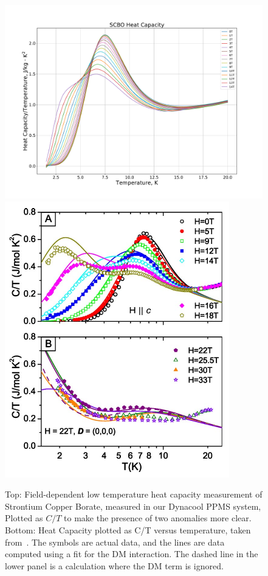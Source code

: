 \documentclass{thesis-umich}
\begin{document}
\begin{figure}
	\centering
	\caption[Low Temperature Heat Capacity of SCBO]{Top: Field-dependent low temperature heat capacity measurement of Strontium Copper Borate, measured in our Dynacool PPMS system, Plotted as $C/T$ to make the presence of two anomalies more clear. Bottom: Heat Capacity plotted as C/T versus temperature, taken from~\cite{Jorge2005}. The symbols are actual data, and the lines are data computed using a fit for the DM interaction. The dashed line in the lower panel is a calculation where the DM term is ignored.}
	\label{fig:scbo_hc}
	\includegraphics[width=\columnwidth]{figures/SCBO_total_HC_over_T.pdf}
	\includegraphics[width=0.5\columnwidth]{figures/SCBO_HC_Jorge_2005.pdf}
\end{figure}
\end{document}
